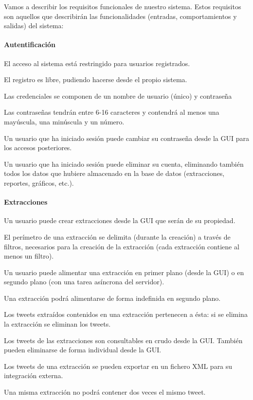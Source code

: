 
Vamos a describir los requisitos funcionales de nuestro sistema. Estos requisitos son aquellos que describirán las funcionalidades (entradas, comportamientos y salidas) del sistema:

\begin{functional}
\paragraph{Autentificación}
        \item El acceso al sistema está restringido para usuarios registrados.
        \begin{functional}
                \item El registro es libre, pudiendo hacerse desde el propio sistema.
                \item Las credenciales se componen de un nombre de usuario (único) y contraseña
        \end{functional}
        \item Las contraseñas tendrán entre 6-16 caracteres y contendrá al menos una mayúscula, una minúscula y un número.
        \item Un usuario que ha iniciado sesión puede cambiar su contraseña desde la GUI para los accesos posteriores.
        \item Un usuario que ha iniciado sesión puede eliminar su cuenta, eliminando también todos los datos que hubiere almacenado en la base de datos (extracciones, reportes, gráficos, etc.).

\paragraph{Extracciones}

	\item Un usuario puede crear extracciones desde la GUI que serán de su propiedad.
	\item El perímetro de una extracción se delimita (durante la creación) a través de filtros, necesarios para la creación de la extracción (cada extracción contiene al menos un filtro).
	\item  Un usuario puede alimentar una extracción en primer plano (desde la GUI) o en segundo plano (con una tarea asíncrona del servidor).
	\item Una extracción podrá alimentarse de forma indefinida en segundo plano.
	\item Los tweets extraídos contenidos en una extracción pertenecen a ésta: si se elimina la extracción se eliminan los tweets.
	\item Los tweets de las extracciones son consultables en crudo desde la GUI. También pueden eliminarse de forma individual desde la GUI.
	\item Los tweets de una extracción se pueden exportar en un fichero XML para su integración externa.
	\item Una misma extracción no podrá contener dos veces el mismo tweet.
	

\end{functional}
